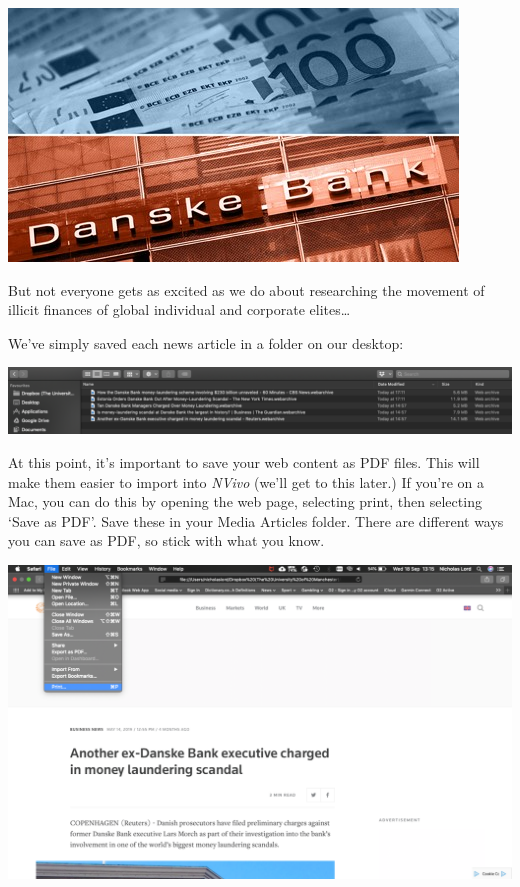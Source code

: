 \documentclass[
]{book}
\begin{document}
\includegraphics{imgs/dankse.jpg}

But not everyone gets as excited as we do about researching the movement of illicit finances of global individual and corporate elites\ldots{}

We've simply saved each news article in a folder on our desktop:

\includegraphics{imgs/dankse_folder.png}

At this point, it's important to save your web content as PDF files. This will make them easier to import into \emph{NVivo} (we'll get to this later.) If you're on a Mac, you can do this by opening the web page, selecting print, then selecting `Save as PDF'. Save these in your Media Articles folder. There are different ways you can save as PDF, so stick with what you know.

\includegraphics{imgs/mac_news_1.png}
\end{document}
